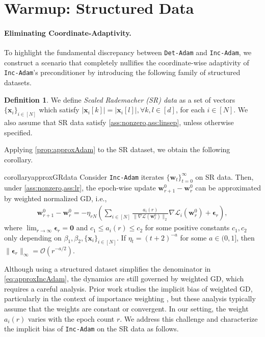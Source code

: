 \documentclass{article} %
\theoremstyle{plain}
\theoremstyle{definition}
\newtheorem{definition}[theorem]{Definition}
\theoremstyle{remark}
\def\bigopen#1{\left(#1\right)}
\newcommand{\Ls}{\mathcal{L}}
\def\bx{{\mathbf x}}
\def\bw{{\mathbf w}}
\begin{document}
\section{Warmup: Structured Data}\label{sec:structured}

\paragraph{Eliminating Coordinate-Adaptivity.} 
To highlight the fundamental discrepancy between \texttt{Det-Adam} and \texttt{Inc-Adam}, we construct a scenario that completely nullifies the coordinate-wise adaptivity of \texttt{Inc-Adam}'s preconditioner by introducing the following family of structured datasets.

\begin{definition}
    We define \textit{Scaled Rademacher (SR) data} as a set of vectors $\{\bx_i\}_{i \in [N]}$ which satisfy $|\bx_i [k]| = |\bx_i [l]|, \forall k, l \in [d]$, for each $i \in [N]$. We also assume that SR data satisfy \cref{ass:nonzero,ass:linsep}, unless otherwise specified.
\end{definition}

Applying \cref{prop:approxAdam} to the SR dataset, we obtain the following corollary.

\begin{restatable}{corollary}{approxGRdata}\label{cor:approxGRdata}
    Consider \textnormal{\texttt{Inc-Adam}} iterates $\{\bw_t\}_{t=0}^\infty$ on SR data. Then, under \cref{ass:nonzero,ass:lr}, the epoch-wise update $\bw_{r+1}^0 - \bw_r^0$ can be approximated by weighted normalized GD, i.e., 
    \begin{align}\label{eq:GRdata}
        \bw_{r+1}^0-\bw_{r}^0 = -\eta_{rN} \bigopen{\sum_{i \in [N]}\frac{a_i(r)}{\|\nabla\Ls(\bw_r^0)\|_2}\nabla\Ls_i(\bw_r^0)+ \boldsymbol{\epsilon}_r},
    \end{align}
    where $\lim_{r \rightarrow \infty}\boldsymbol{\epsilon}_r = \mathbf{0}$ and $c_1 \leq a_i(r) \leq c_2$ for some positive constants $c_1, c_2$ only depending on $\beta_1, \beta_2, \{\bx_i\}_{i \in [N]}$. If $\eta_t = (t+2)^{-a}$ for some $a \in (0, 1]$, then $\|\boldsymbol{\epsilon}_r\|_\infty = \mathcal{O}(r^{-a/2})$.
\end{restatable}

Although using a structured dataset simplifies the denominator in \cref{eq:approxIncAdam}, the dynamics are still governed by weighted GD, which requires a careful analysis. Prior work studies the implicit bias of weighted GD, particularly in the context of importance weighting \citep{xu2021understanding,zhai2023understanding}, but these analysis typically assume that the weights are constant or convergent. In our setting, the weight $a_i(r)$ varies with the epoch count $r$. We address this challenge and characterize the implicit bias of \texttt{Inc-Adam} on the SR data as follows.
\end{document}
